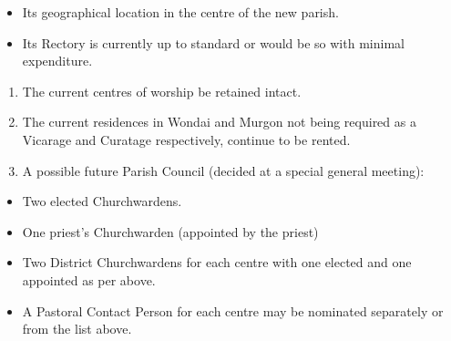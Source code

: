 \begin{itemize}

\item

  Its geographical location in the centre of the new parish.

\item

  Its Rectory is currently up to standard or would be so with minimal expenditure.

\end{itemize}



\begin{enumerate}

\def\labelenumi{\arabic{enumi}.}

\setcounter{enumi}{2}

\item

  The current centres of worship be retained intact.

\item

  The current residences in Wondai and Murgon not being required as a Vicarage and Curatage respectively, continue to be rented.

\item

  A possible future Parish Council (decided at a special general meeting):

\end{enumerate}



\begin{itemize}

\item

  Two elected Churchwardens.

\item

  One priest's Churchwarden (appointed by the priest)

\item

  Two District Churchwardens for each centre with one elected and one appointed as per above.

\item

  A Pastoral Contact Person for each centre may be nominated separately or from the list above.

\end{itemize}



